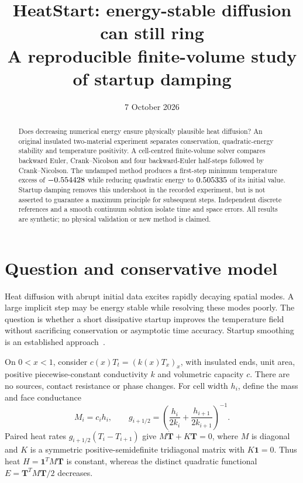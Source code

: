 \documentclass[11pt,a4paper]{article}
\title{HeatStart: energy-stable diffusion can still ring\\
\large A reproducible finite-volume study of startup damping}
\author{}
\date{7 October 2026}
\begin{document}
\maketitle
\vspace{-10mm}
\begin{abstract}
Does decreasing numerical energy ensure physically plausible heat diffusion?
An original insulated two-material experiment separates conservation,
quadratic-energy stability and temperature positivity. A cell-centred
finite-volume solver compares backward Euler, Crank--Nicolson and four
backward-Euler half-steps followed by Crank--Nicolson. The undamped method
produces a first-step minimum temperature excess of $-0.554428$ while
reducing quadratic energy to $0.505335$ of its initial value. Startup damping
removes this undershoot in the recorded experiment, but is not asserted to
guarantee a maximum principle for subsequent steps. Independent discrete
references and a smooth continuum solution isolate time and space errors.
All results are synthetic; no physical validation or new method is claimed.
\end{abstract}

\section{Question and conservative model}
Heat diffusion with abrupt initial data excites rapidly decaying spatial
modes. A large implicit step may be energy stable while resolving these modes
poorly. The question is whether a short dissipative startup improves the
temperature field without sacrificing conservation or asymptotic time accuracy.
Startup smoothing is an established approach~\cite{rannacher,langtangen}.

On $0<x<1$, consider $c(x)T_t=(k(x)T_x)_x$, with insulated ends, unit area,
positive piecewise-constant conductivity $k$ and volumetric capacity $c$.
There are no sources, contact resistance or phase changes. For cell width
$h_i$, define the mass and face conductance
\begin{equation}
 M_i=c_i h_i,\qquad g_{i+1/2}=
 \left(\frac{h_i}{2k_i}+\frac{h_{i+1}}{2k_{i+1}}\right)^{-1}.
\end{equation}
Paired heat rates $g_{i+1/2}(T_i-T_{i+1})$ give
$M\dot{\boldsymbol T}+K\boldsymbol T=0$, where $M$ is diagonal and $K$
is a symmetric positive-semidefinite tridiagonal matrix with $K\boldsymbol1=0$.
Thus heat $H=\boldsymbol1^TM\boldsymbol T$ is constant, whereas the distinct
quadratic functional $E=\boldsymbol T^TM\boldsymbol T/2$ decreases.
\end{document}
